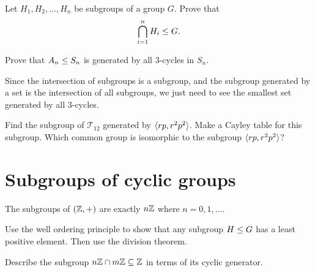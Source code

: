 \documentclass{ximera}
\begin{document}
\begin{exercise}
  Let $H_1,H_2,\dots,H_n$ be subgroups of a group $G$. Prove that
  \[
  \bigcap_{i=1}^n H_i \leq G.
  \]
\end{exercise}





\begin{exercise}
  Prove that $A_n\leq S_n$ is generated by all $3$-cycles in $S_n$.
  \begin{hint}
    Since the intersection of subgroups is a subgroup, and the
    subgroup generated by a set is the intersection of all subgroups,
    we just need to see the smallest set generated by all $3$-cycles. 
  \end{hint}
\end{exercise}

\begin{exercise}
  Find the subgroup of $\mathcal{T}_12$ generated by $\langle rp,
  r^2p^2\rangle$. Make a Cayley table for this subgroup. Which common
  group is isomorphic to the subgroup $\langle rp, r^2p^2\rangle$?
\end{exercise}





\section{Subgroups of cyclic groups}

\begin{theorem}
  The subgroups of $(\mathbb Z,+)$ are exactly $n\mathbb Z$ where $n = 0,1,\dots$.
  \begin{sketch}
    Use the well ordering principle to show that any subgroup $H\leq
    G$ has a least positive element. Then use the division theorem.
  \end{sketch}
\end{theorem}

\begin{exercise}
  Describe the subgroup $n\mathbb Z\cap m\mathbb Z \subseteq \mathbb Z$ in terms of its
  cyclic generator.
\end{exercise}
\end{document}
